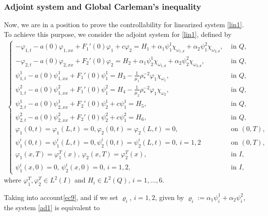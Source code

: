\documentclass[11pt,a4paper]{amsart}
\numberwithin{equation}{section}
\begin{document}
\subsubsection{Adjoint system and Global Carleman’s inequality }
Now, we are in a position to prove the controllability for linearized system \eqref{lin1}. To achieve this purpose,  we consider the adjoint system for \eqref{lin1}, defined by 
\begin{align} \label{ad1}
		\begin{cases}
			-\varphi_{1,t}-a(0)\varphi_{1,xx}+F_1'(0)\varphi_1+c\varphi_2   = H_1+\alpha_1\psi_1^1\chi_{\omega_{1,d}} +\alpha_2\psi_1^2\chi_{\omega_{2,d}},&\text{ in } Q,\\
			-\varphi_{2,t}-a(0)\varphi_{2,xx}+F_2'(0)\varphi_2  = H_2+\alpha_1\psi_2^1\chi_{\omega_{1,d}} +\alpha_2\psi_2^2\chi_{\omega_{2,d}},&\text{ in } Q,\\
			\psi_{1,t}^1-a(0)\psi_{1,xx}^1+F_1'(0)\psi_1^1=H_3-\frac{1}{\mu_1}\rho_*^{-2}\varphi_1\chi_{\omega_1},&\text{ in } Q, \\
			\psi_{1,t}^2-a(0)\psi_{1,xx}^2+F_1'(0)\psi_1^2=H_4-\frac{1}{\mu_2}\rho_*^{-2}\varphi_1\chi_{\omega_2},&\text{ in } Q,\\
			\psi_{2,t}^1-a(0)\psi_{2,xx}^1+F_2'(0)\psi_2^1+c\psi_1^1=H_5, &\text{ in } Q,\\
			\psi_{2,t}^2-a(0)\psi_{2,xx}^2+F_2'(0)\psi_2^2+c\psi_1^2=H_6, &\text{ in } Q,\\
   			\varphi_1(0,t) = \varphi_1(L,t) =0, \varphi_2(0,t) = \varphi_2(L,t) = 0, &\text{ on } (0,T),\\
			\psi_1^i(0,t) = \psi_1^i(L,t) =0, \psi_2^i(0,t) = \psi_2^i(L,t) = 0,\, i=1,2&\text{ on } (0,T),\\
			\varphi_1(x,T) =\varphi_1^T(x), \, \varphi_2(x,T) =\varphi_2^T(x),&\text{ in } I,\\
			\psi_1^i(x,0) = 0, \, \psi_2^i(x,0) = 0, \, i=1,2,&\text{ in } I,
		\end{cases}		
	\end{align}where $\varphi_1^T, \varphi_2^T \in L^2(I)$ and $H_i \in L^2(Q)$, $i = 1,\ldots, 6$.

    \noindent Taking into account\eqref{ec9}, and if we set $\varrho_i$,  $i=1,2$, given by $\varrho_i:=\alpha_1\psi_i^1 + \alpha_2\psi_i^2$, the system \eqref{ad1} is equivalent to 
\end{document}
